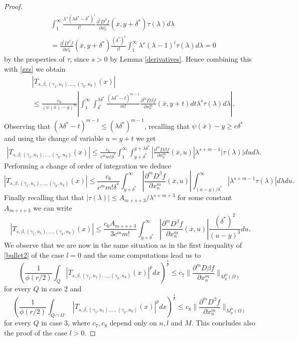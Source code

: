 \documentclass[12pt]{article}
\theoremstyle{definition}
\begin{document}
\begin{proof}
\begin{align*} &\int_1^\infty \frac{\lambda^s(\lambda \delta^*-\delta^*)^i}{i!}\frac{\partial^i D^\beta f}{\partial x_n^i}(\overline x,y+\delta^*)\tau(\lambda)d\lambda \\
&=\frac{\partial^i D^\beta f}{\partial x_n^i}(\overline x,y+\delta^*) \frac{(\delta^*)^i}{i!} \int_1^\infty \lambda^s(\lambda-1)^i\tau(\lambda)d\lambda=0
\end{align*}
by the properties of $\tau$, since $s>0$ by Lemma \ref{derivatives}. Hence combining this with \eqref{zzz} we obtain
\begin{align*}
&|T_{s,\beta,(\gamma_1,n_1),...,(\gamma_k,n_k)}(x) | \\
&\le \frac{c_6}{(\psi(\overline x)-y)^{m}} \left |\int_1^\infty \int_{\delta^*}^{\lambda \delta^*} \frac{(\lambda \delta^*-t)^{m-1}}{m!}\frac{\partial^{m} D\beta f}{\partial x_n^{m} }(\overline x,y+t)dt \lambda^s \tau(\lambda)d\lambda\right |.
\end{align*}
Observing that $(\lambda\delta^*-t)^{m-1}\le (\lambda\delta^*)^{m-1}$, recalling that $\psi(\overline x)-y\ge c \delta^*$ and using the change of variable $u=y+t$ we get
\begin{align*}
|T_{s,\beta,(\gamma_1,n_1),...,(\gamma_k,n_k)}(x) | \le \frac{c_6}{c^mm!\delta^*}\int_1^\infty \int_{y+\delta^*}^{y+\lambda \delta^*} \left|\frac{\partial^{m} D\beta f}{\partial x_n^{m} }(\overline x,u)\right |\lambda^{s+m-1} |\tau(\lambda)|du d\lambda.
\end{align*}
Performing a change of order of integration we deduce
\[ |T_{s,\beta,(\gamma_1,n_1),...,(\gamma_k,n_k)}(x) | \le\frac{c_6}{c^mm!\delta^*}\int_{y+\delta^*}^{\infty} \left |\frac{\partial^{m} D^\beta f}{\partial x_n^{m} }(\overline x,u)\right | \int_{(u-y)/\delta^*}^\infty |\lambda^{s+m-1} \tau(\lambda)| d\lambda du.\]
Finally recalling that that  $|\tau(\lambda)|\le A_{m+s+3}/\lambda^{s+m+3}$ for some constant $A_{m+s+3}$ we can write
\[ |T_{s,\beta,(\gamma_1,n_1),...,(\gamma_k,n_k)}(x) | \le\frac{c_6 A_{m+s+3}}{3c^mm!} \int_{y+\delta^*}^{\infty} \left |\frac{\partial^{m} D^\beta f}{\partial x_n^{m} }(\overline x,u)\right | \frac{(\delta^*)^2}{(u-y)^3} du.\]
We observe that we are now in the same situation as in the first inequality of \eqref{bullet2} of the case $l=0$ and the same computations lead us to
\[\left( \frac{1}{\phi(r/2)}\int_Q  \left| T_{s,\beta,(\gamma_1,n_1),...,(\gamma_k,n_k)}(x)\right|^p dx\right )^{\frac{1}{p}} \le c_7 \bigl\| \frac{\partial^{m} D\beta f}{\partial x_n^{m} } \bigr\|_{M_p^\phi(\Omega)} \] 
for every $Q$ in case 2  and
\[\left( \frac{1}{\phi(r/2)}\int_{Q\cap \Omega^-}  \left| T_{s,\beta,(\gamma_1,n_1),...,(\gamma_k,n_k)}(x)\right|^p dx\right )^{\frac{1}{p}} \le c_8 \bigl\| \frac{\partial^{m} D^\beta f}{\partial x_n^{m} } \bigr\|_{M_p^\phi(\Omega)} \] 
for every $Q$ in case 3, where $c_7,c_8$ depend only on $n,l$ and $M$. This concludes also the proof of the case $l>0.$
\end{proof} 
\end{document}
